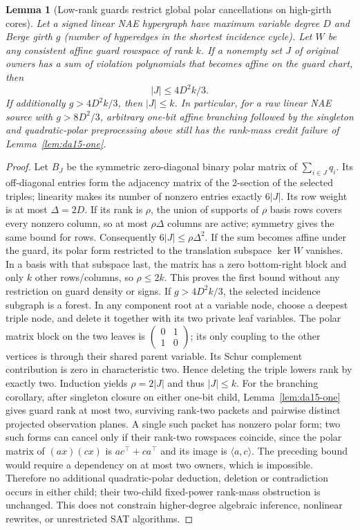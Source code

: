 \documentclass[11pt]{article}
\newtheorem{lemma}[theorem]{Lemma}
\begin{document}
\begin{lemma}[Low-rank guards restrict global polar cancellations on high-girth cores]\label{lem:ba15-guard}
Let a signed linear NAE hypergraph have maximum variable degree $D$ and Berge girth $g$ (number of hyperedges in the shortest incidence cycle). Let $W$ be any consistent affine guard rowspace of rank $k$. If a nonempty set $J$ of original owners has a sum of violation polynomials that becomes affine on the guard chart, then
\[
 |J|\le 4D^2 k/3.
\]
If additionally $g>4D^2 k/3$, then $|J|\le k$. In particular, for a raw linear NAE source with $g>8D^2/3$, arbitrary one-bit affine branching followed by the singleton and quadratic-polar preprocessing above still has the rank-mass credit failure of Lemma~\ref{lem:da15-one}.
\end{lemma}
\begin{proof}
Let $B_J$ be the symmetric zero-diagonal binary polar matrix of $\sum_{i\in J}q_i$. Its off-diagonal entries form the adjacency matrix of the 2-section of the selected triples; linearity makes its number of nonzero entries exactly $6|J|$. Its row weight is at most $\Delta=2D$. If its rank is $\rho$, the union of supports of $\rho$ basis rows covers every nonzero column, so at most $\rho\Delta$ columns are active; symmetry gives the same bound for rows. Consequently $6|J|\le \rho\Delta^2$. If the sum becomes affine under the guard, its polar form restricted to the translation subspace $\ker W$ vanishes. In a basis with that subspace last, the matrix has a zero bottom-right block and only $k$ other rows/columns, so $\rho\le2k$. This proves the first bound without any restriction on guard density or signs.
If $g>4D^2 k/3$, the selected incidence subgraph is a forest. In any component root at a variable node, choose a deepest triple node, and delete it together with its two private leaf variables. The polar matrix block on the two leaves is $\left(\begin{smallmatrix}0&1\\1&0\end{smallmatrix}\right)$; its only coupling to the other vertices is through their shared parent variable. Its Schur complement contribution is zero in characteristic two. Hence deleting the triple lowers rank by exactly two. Induction yields $\rho=2|J|$ and thus $|J|\le k$.
For the branching corollary, after singleton closure on either one-bit child, Lemma~\ref{lem:da15-one} gives guard rank at most two, surviving rank-two packets and pairwise distinct projected observation planes. A single such packet has nonzero polar form; two such forms can cancel only if their rank-two rowspaces coincide, since the polar matrix of $(a x)(c x)$ is $ac^\top+ca^\top$ and its image is $\langle a,c\rangle$. The preceding bound would require a dependency on at most two owners, which is impossible. Therefore no additional quadratic-polar deduction, deletion or contradiction occurs in either child; their two-child fixed-power rank-mass obstruction is unchanged. This does not constrain higher-degree algebraic inference, nonlinear rewrites, or unrestricted SAT algorithms.
\end{proof}
\end{document}
